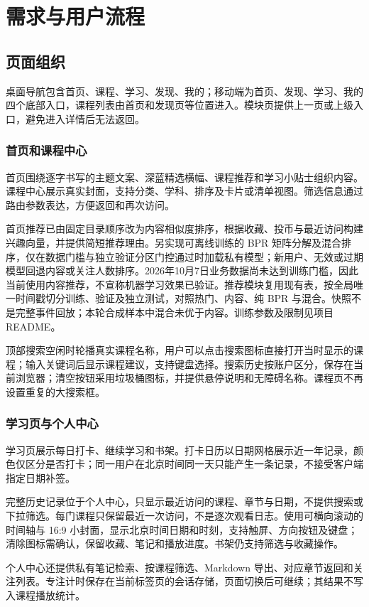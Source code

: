 \documentclass[UTF8,12pt,a4paper,openany,oneside]{ctexbook}
\begin{document}
\chapter{需求与用户流程}
\section{页面组织}
桌面导航包含首页、课程、学习、发现、我的；移动端为首页、发现、学习、我的四个底部入口，课程列表由首页和发现页等位置进入。模块页提供上一页或上级入口，避免进入详情后无法返回。

\subsection{首页和课程中心}
首页围绕逐字书写的主题文案、深蓝精选横幅、课程推荐和学习小贴士组织内容。课程中心展示真实封面，支持分类、学科、排序及卡片或清单视图。筛选信息通过路由参数表达，方便返回和再次访问。

首页推荐已由固定目录顺序改为内容相似度排序，根据收藏、投币与最近访问构建兴趣向量，并提供简短推荐理由。另实现可离线训练的 BPR 矩阵分解及混合排序，仅在数据门槛与独立验证分区门控通过时加载私有模型；新用户、无效或过期模型回退内容或关注人数排序。2026年10月7日业务数据尚未达到训练门槛，因此当前使用内容推荐，不宣称机器学习效果已验证。推荐模块复用现有表，按全局唯一时间戳切分训练、验证及独立测试，对照热门、内容、纯 BPR 与混合。快照不是完整事件回放；本轮合成样本中混合未优于内容。训练参数及限制见项目 README。

顶部搜索空闲时轮播真实课程名称，用户可以点击搜索图标直接打开当时显示的课程；输入关键词后显示课程建议，支持键盘选择。搜索历史按账户区分，保存在当前浏览器；清空按钮采用垃圾桶图标，并提供悬停说明和无障碍名称。课程页不再设置重复的大搜索框。

\subsection{学习页与个人中心}
学习页展示每日打卡、继续学习和书架。打卡日历以日期网格展示近一年记录，颜色仅区分是否打卡；同一用户在北京时间同一天只能产生一条记录，不接受客户端指定日期补签。

完整历史记录位于个人中心，只显示最近访问的课程、章节与日期，不提供搜索或下拉筛选。每门课程只保留最近一次访问，不是逐次观看日志。使用可横向滚动的时间轴与 16:9 小封面，显示北京时间日期和时刻，支持触屏、方向按钮及键盘；清除图标需确认，保留收藏、笔记和播放进度。书架仍支持筛选与收藏操作。

个人中心还提供私有笔记检索、按课程筛选、Markdown 导出、对应章节返回和关注列表。专注计时保存在当前标签页的会话存储，页面切换后可继续；其结果不写入课程播放统计。
\end{document}
